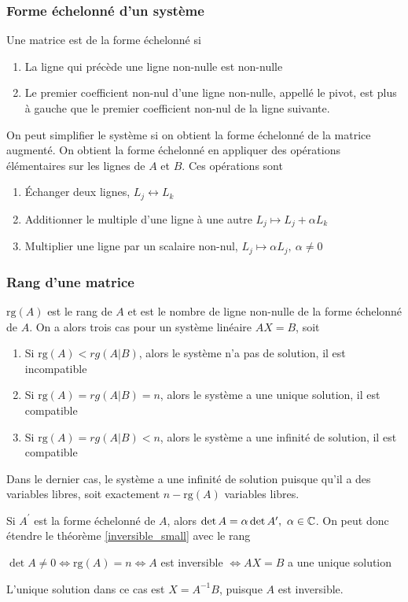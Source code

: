 \subsubsection{Forme échelonné d'un système}
\noindent
Une matrice est de la forme échelonné si \begin{enumerate}
    \item La ligne qui précède une ligne non-nulle est non-nulle
    \item Le premier coefficient non-nul d'une ligne non-nulle, appellé le pivot, est plus à
          gauche que le premier coefficient non-nul de la ligne suivante.
\end{enumerate}
On peut simplifier le système si on obtient la forme échelonné de la matrice augmenté. On obtient la forme échelonné
en appliquer des opérations élémentaires sur les lignes de $A$ et $B$. Ces opérations sont \begin{enumerate}
    \item Échanger deux lignes, $L_j \leftrightarrow L_k$
    \item Additionner le multiple d'une ligne à une autre $L_j \mapsto L_j + \alpha L_k$
    \item Multiplier une ligne par un scalaire non-nul, $L_j \mapsto \alpha L_j, \ \alpha \neq 0$
\end{enumerate}

\subsubsection{Rang d'une matrice}
$\text{rg}(A)$ est le rang de $A$ et est le nombre de ligne non-nulle de la forme échelonné
de $A$. On a alors trois cas pour un système linéaire $AX = B$, soit \begin{enumerate}
    \item Si $\text{rg}(A) < rg(A|B)$, alors le système n'a pas de solution, il est incompatible
    \item Si $\text{rg}(A) = rg(A|B) = n$, alors le système a une unique solution, il est compatible
    \item Si $\text{rg}(A) = rg(A|B) < n$, alors le système a une infinité de solution, il est compatible
\end{enumerate}
Dans le dernier cas, le système a une infinité de solution puisque qu'il a des variables libres,
soit exactement $n - \text{rg}(A)$ variables libres.
\begin{remark}
    Si $A^\prime$ est la forme échelonné de $A$, alors $\det A = \alpha \det A^\prime, \ \alpha \in \mathbb{C}$.
    On peut donc étendre le théorème \ref{inversible_small} avec le rang
\end{remark}
\begin{theorem}
    $\det A \neq 0 \iff \text{rg}(A) = n \iff A $ est inversible $\iff AX=B $ a une unique solution
\end{theorem}
\begin{remark}
    L'unique solution dans ce cas est $X = A^{-1}B$, puisque $A$ est inversible.
\end{remark}

